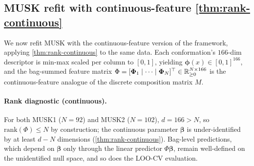 \subsection{MUSK refit with continuous-feature \cref{thm:rank-continuous}}
\label{sec:musk-continuous}

We now refit MUSK with the continuous-feature version of the
framework, applying \cref{thm:rank-continuous} to the same data.
Each conformation's $166$-dim descriptor is min-max scaled per
column to $[0, 1]$, yielding $\bm\phi(x) \in [0, 1]^{166}$, and the
bag-summed feature matrix $\Phi = [\bm\Phi_1 \mid \cdots \mid
\bm\Phi_N]^\top \in \mathbb{R}^{N \times 166}_{\geq 0}$ is the
continuous-feature analogue of the discrete composition matrix
$M$.

\paragraph{Rank diagnostic (continuous).} For both MUSK1 ($N=92$)
and MUSK2 ($N=102$), $d=166 > N$, so $\mathrm{rank}(\Phi) \leq N$
by construction; the continuous parameter $\bm\beta$ is
under-identified by at least $d - N$ dimensions
(\cref{thm:rank-continuous}). Bag-level predictions, which depend
on $\bm\beta$ only through the linear predictor $\Phi\bm\beta$,
remain well-defined on the unidentified null space, and so does the
LOO-CV evaluation.

